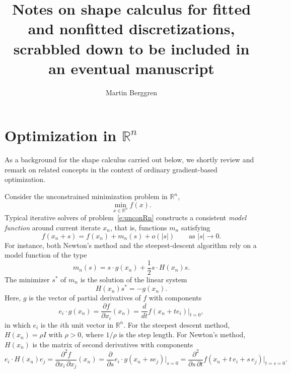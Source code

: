 \documentclass{article}
\title{Notes on shape calculus for fitted and nonfitted discretizations,  scrabbled down to be included in an eventual manuscript}
\author{Martin Berggren}
\theoremstyle{remark}
\numberwithin{equation}{section}
\newcommand{\RR}{\mathbb{R}}
\begin{document}
\maketitle

\section{Optimization in $\RR^n$}\label{s:Rn}

As a background for the shape calculus carried out below, we shortly review and remark on related concepts in the context of ordinary gradient-based optimization.

%
Consider the unconstrained minimization problem in $\RR^n$,
\begin{equation}\label{e:unconRn}
\min_{x\in\RR^n} f(x).
\end{equation}
%
Typical iterative solvers of problem~\eqref{e:unconRn} constructs a consistent \textit{model function} around current iterate $x_n$, that is, functions $m_n$ satisfying
%
\begin{equation}
f(x_n + s) = f(x_n) + m_n(s) + o(\lvert s\rvert)\qquad\text{as $\lvert s\rvert\to0$.}
\end{equation}
%
For instance, both Newton’s method and the steepest-descent algorithm rely on a model function of the type
%
\begin{equation}\label{e:mndef}
m_n(s) = s\cdot g(x_n) + \frac12 s\cdot H(x_n) s.    
\end{equation}
%
The minimizer $s^*$ of $m_n$ is the solution of the linear system
%
\begin{equation}
H(x_n)s^* = - g(x_n). 
\end{equation}
%
Here, $g$ is the vector of partial derivatives of $f$ with components
%
\begin{equation}\label{e:gradient}
e_i\cdot g(x_n) = \frac{\partial f}{\partial x_i}(x_n) = 
\frac d{dt} f(x_n + te_i)\big|_{t=0},
\end{equation}
%
in which $e_i$ is the $i$th unit vector in $\RR^n$.
For the steepest descent method, $H(x_n)= \rho I$ with $\rho>0$, where $1/\rho$ is the step length. 
For Newton’s method, $H(x_n)$ is the matrix of second derivatives with components
%
\begin{equation}\label{e:Hessian}
e_i\cdot H(x_n) e_j 
= \frac{\partial^2f}{\partial x_i\,\partial x_j}(x_n) 
= \frac{\partial}{\partial s}e_i\cdot g(x_n + se_j)\big|_{s=0}
= \frac{\partial^2}{\partial s\,\partial t} f(x_n + t\,e_i + s\,e_j)\big|_{t=s=0}.
\end{equation}
\end{document}
